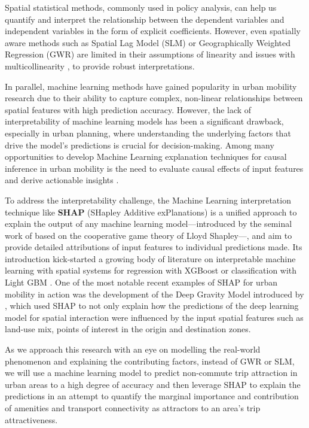 Spatial statistical methods, commonly used in policy analysis, can help us quantify and interpret the relationship between the dependent variables and independent variables in the form of explicit coefficients. However, even spatially aware methods such as Spatial Lag Model (SLM) or Geographically Weighted Regression (GWR) are limited in their assumptions of linearity and issues with multicollinearity \citep{wheelerMulticollinearityCorrelationLocal2005}, to provide robust interpretations.

In parallel, machine learning methods have gained popularity in urban mobility research due to their ability to capture complex, non-linear relationships between spatial features with high prediction accuracy. However, the lack of interpretability of machine learning models has been a significant drawback, especially in urban planning, where understanding the underlying factors that drive the model's predictions is crucial for decision-making. Among many opportunities to develop Machine Learning explanation techniques for causal inference in urban mobility is the need to evaluate causal effects of input features and derive actionable insights \citep{xinVisionPaperCausal2022}.

To address the interpretability challenge, the Machine Learning interpretation technique like \textbf{SHAP} (SHapley Additive exPlanations) is a unified approach to explain the output of any machine learning model---introduced by the seminal work of \citet{lundbergUnifiedApproachInterpreting2017a} based on the cooperative game theory of Lloyd Shapley---, and aim to provide detailed attributions of input features to individual predictions made. Its introduction kick-started a growing body of literature on interpretable machine learning with spatial systems for regression with XGBoost \citep{liExtractingSpatialEffects2022} or classification with Light GBM \citep{louhichiShapleyValuesExplaining2023}. One of the most notable recent examples of SHAP for urban mobility in action was the development of the Deep Gravity Model introduced by \cite{siminiDeepGravityModel2021}, which used SHAP to not only explain how the predictions of the deep learning model for spatial interaction were influenced by the input spatial features such as land-use mix, points of interest in the origin and destination zones. 

As we approach this research with an eye on modelling the real-world phenomenon and explaining the contributing factors, instead of GWR or SLM, we will use a machine learning model to predict non-commute trip attraction in urban areas to a high degree of accuracy and then leverage SHAP to explain the predictions in an attempt to quantify the marginal importance and contribution of amenities and transport connectivity as attractors to an area's trip attractiveness.

